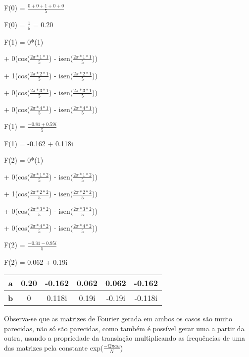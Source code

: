 \begin{question}
\begin{enumerate}[label=\textbf{\alph*})]
      F(0) = $\frac{0 + 0 + 1 + 0 + 0}{5}$
    
      F(0) = $\frac{1}{5}$ = 0.20
    
      F(1) = 0*(1) 
    
      + 0(cos($\frac{2\pi*1*1}{5}$) - isen($\frac{2\pi*1*1}{5}$))
      
      + 1(cos($\frac{2\pi*2*1}{5}$) - isen($\frac{2\pi*2*1}{5}$))
    
      + 0(cos($\frac{2\pi*3*1}{5}$) - isen($\frac{2\pi*3*1}{5}$))
    
      + 0(cos($\frac{2\pi*4*1}{5}$) - isen($\frac{2\pi*4*1}{5}$)) 
    
      F(1) =  $\frac{-0.81 + 0.59i}{5}$
    
      F(1) = -0.162 + 0.118i
    
      F(2) = 0*(1) 
    
      + 0(cos($\frac{2\pi*1*2}{5}$) - isen($\frac{2\pi*1*2}{5}$))
      
      + 1(cos($\frac{2\pi*2*2}{5}$) - isen($\frac{2\pi*2*2}{5}$))
    
      + 0(cos($\frac{2\pi*3*2}{5}$) - isen($\frac{2\pi*3*2}{5}$))
    
      + 0(cos($\frac{2\pi*4*2}{5}$) - isen($\frac{2\pi*4*2}{5}$)) 
    
      F(2) =  $\frac{-0.31 - 0.95i}{5}$
    
      F(2) = 0.062 + 0.19i

      \begin{table}[ht]
        \centering 
        \begin{tabular}{|c|c|c|c|c|c|}
            \hline
            \textbf{a} & 0.20 & -0.162 & 0.062 & 0.062 & -0.162 \\ 
            \hline
            \textbf{b} & 0 & 0.118i & 0.19i & -0.19i & -0.118i \\ 
            \hline
        \end{tabular}
      \end{table}

      \end{enumerate}

      Observa-se que as matrizes de Fourier gerada em ambos os casos são 
      muito parecidas, não só são parecidas, como também é possível gerar 
      uma a partir da outra, usando a propriedade da translação multiplicando 
      as frequências de uma das matrizes pela constante exp($\frac{-i2\pi au}{N}$)
\end{question}